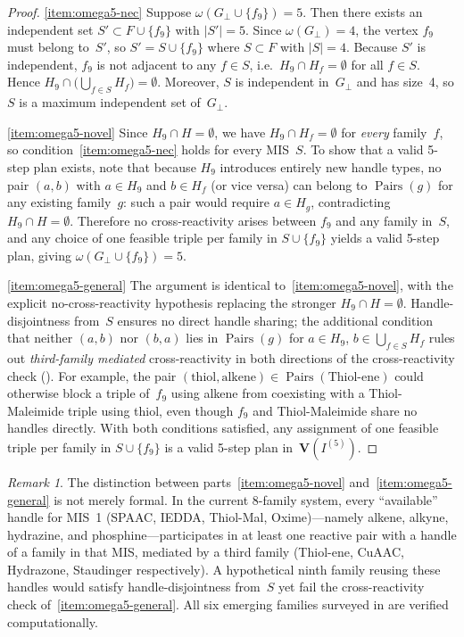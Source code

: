 \documentclass[preprint,12pt]{elsarticle}
\theoremstyle{definition}
\theoremstyle{remark}
\newtheorem{remark}[theorem]{Remark}
\newcommand{\Var}{\mathbf{V}}
\DeclareMathOperator{\Pairs}{Pairs}
\begin{document}
\begin{proof}
\cref{item:omega5-nec}\;
Suppose $\omega(G_\perp \cup \{f_9\}) = 5$.
Then there exists an independent set $S' \subset F \cup \{f_9\}$
with $|S'| = 5$.  Since $\omega(G_\perp) = 4$, the vertex
$f_9$ must belong to~$S'$, so $S' = S \cup \{f_9\}$ where
$S \subset F$ with $|S| = 4$.  Because $S'$ is independent,
$f_9$ is not adjacent to any $f \in S$, i.e.\
$H_9 \cap H_f = \emptyset$ for all $f \in S$.  Hence
$H_9 \cap \bigl(\bigcup_{f \in S} H_f\bigr) = \emptyset$.
Moreover, $S$ is independent in~$G_\perp$ and has size~4,
so $S$ is a maximum independent set of~$G_\perp$.

\cref{item:omega5-novel}\;
Since $H_9 \cap H = \emptyset$, we have $H_9 \cap H_f = \emptyset$
for \emph{every} family~$f$, so condition~\cref{item:omega5-nec}
holds for every MIS~$S$.  To show that a valid 5-step plan
exists, note that because $H_9$ introduces entirely new handle
types, no pair $(a, b)$ with $a \in H_9$ and $b \in H_f$ (or
vice versa) can belong to $\Pairs(g)$ for any existing family~$g$:
such a pair would require $a \in H_g$, contradicting
$H_9 \cap H = \emptyset$.  Therefore no cross-reactivity
arises between $f_9$ and any family in~$S$, and any choice
of one feasible triple per family in $S \cup \{f_9\}$ yields a
valid 5-step plan, giving $\omega(G_\perp \cup \{f_9\}) = 5$.

\cref{item:omega5-general}\;
The argument is identical to~\cref{item:omega5-novel}, with the
explicit no-cross-reactivity hypothesis replacing the stronger
$H_9 \cap H = \emptyset$.  Handle-disjointness from~$S$ ensures
no direct handle sharing; the additional condition that neither
$(a, b)$ nor $(b, a)$ lies in $\Pairs(g)$ for $a \in H_9$,
$b \in \bigcup_{f \in S} H_f$ rules out \emph{third-family
mediated} cross-reactivity in both directions of the
cross-reactivity check ().
For example, the pair $(\text{thiol}, \text{alkene}) \in
\Pairs(\text{Thiol-ene})$ could otherwise block a triple of~$f_9$
using alkene from coexisting with a Thiol-Maleimide triple using
thiol, even though $f_9$ and Thiol-Maleimide share no handles
directly.  With both conditions satisfied, any assignment of one
feasible triple per family in $S \cup \{f_9\}$ is a valid 5-step
plan in~$\Var(I^{(5)})$.
\end{proof}

\begin{remark}\label{rmk:third-family}
The distinction between parts~\cref{item:omega5-novel}
and~\cref{item:omega5-general} is not merely formal.  In the
current 8-family system, every ``available'' handle for MIS~1
(SPAAC, IEDDA, Thiol-Mal, Oxime)---namely alkene, alkyne,
hydrazine, and phosphine---participates in at least one reactive
pair with a handle of a family in that MIS, mediated by a third
family (Thiol-ene, CuAAC, Hydrazone, Staudinger respectively).
A hypothetical ninth family reusing these handles would satisfy
handle-disjointness from~$S$ yet fail the cross-reactivity
check of~\cref{item:omega5-general}.  All six emerging families
surveyed in  are verified computationally.
\end{remark}
\end{document}

